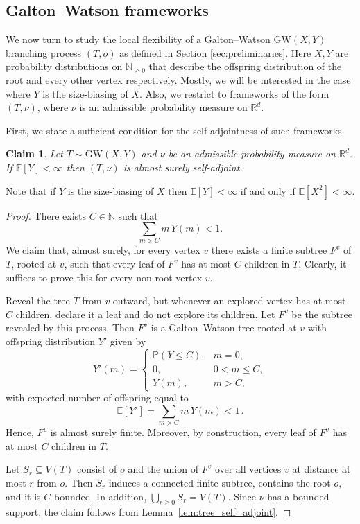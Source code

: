 \documentclass[reqno,english]{amsart}
\numberwithin{equation}{section}
\newtheorem{claim}[theorem]{Claim}
\theoremstyle{definition}{
\newtheorem{example}[theorem]{Example}
\newtheorem{definition}[theorem]{Definition}
\newtheorem*{definition*}{Definition}
\newtheorem{problem}[theorem]{Problem}
\newtheorem{question}[theorem]{Question}
}
\newcommand{\E}{\mathbb E}
\newcommand{\N}{\mathbb N}
\renewcommand{\P}{\mathbb P}
\newcommand{\R}{\mathbb R}
\begin{document}
\subsection{Galton--Watson frameworks}
\label{sec:GW}
We now turn to study the local flexibility of a Galton--Watson $\mathrm{GW}(X,Y)$ branching process $(T,o)$ as defined in Section \ref{sec:preliminaries}.
Here $X,Y$ are probability distributions on $\N_{\ge 0}$ that describe the offspring distribution of the root and every other vertex respectively.
Mostly, we will be interested in the case where $Y$ is the size-biasing of $X$. Also, we restrict to frameworks of the form $(T,\nu)$, where $\nu$ is an admissible probability measure on $\R^d$. 

First, we state a sufficient condition for the self-adjointness of such frameworks.
\begin{claim}\label{clm:GWSA}
    Let $T\sim\mathrm{GW}(X,Y)$ and $\nu$ be an admissible probability measure on $\R^d$. 
    If $\E[Y]<\infty$ then $(T,\nu)$ is almost surely self-adjoint.
\end{claim}
Note that if $Y$ is the size-biasing of $X$ then $\E[Y]<\infty$ if and only if $\E[X^2]<\infty$.
\begin{proof}
There exists $C\in\N$ such that
\begin{equation}\label{eq:chooseC}
\sum_{m>C} m\,Y(m)<1.
\end{equation}
We claim that, almost surely, for every vertex $v$ there exists a finite subtree $F^v$ of $T$, rooted at $v$, such that every leaf of $F^v$
has at most $C$ children in $T$. Clearly, it suffices to prove this for every non-root vertex $v$.

Reveal the tree $T$ from $v$ outward, but whenever an explored vertex has at most $C$ children, declare it a leaf and do not explore its children.
Let $F^v$ be the subtree revealed by this process. Then $F^v$ is a Galton--Watson tree rooted at $v$ with offspring distribution $Y'$ given by
\[
Y'(m)=
\begin{cases}
\P(Y\le C), & m=0,\\
0, & 0<m\le C,\\
Y(m), & m>C,
\end{cases}
\]
with expected number of offspring equal to
\[
\E[Y']=\sum_{m>C} m\,Y(m)<1\,.
\]
Hence, $F^v$ is almost surely finite. Moreover, by construction, every leaf of $F^v$ has at most $C$ children in $T$.

Let $S_r\subseteq V(T)$ consist of $o$ and the union of $F^v$ over all vertices $v$ at distance at most $r$ from $o$.
Then $S_r$ induces a connected finite subtree, contains the root $o$, and it is $C$-bounded. In addition, $\bigcup_{r\ge 0} S_r=V(T)$.
Since $\nu$ has a bounded support, the claim follows from Lemma~\ref{lem:tree_self_adjoint}.
\end{proof}
\end{document}
